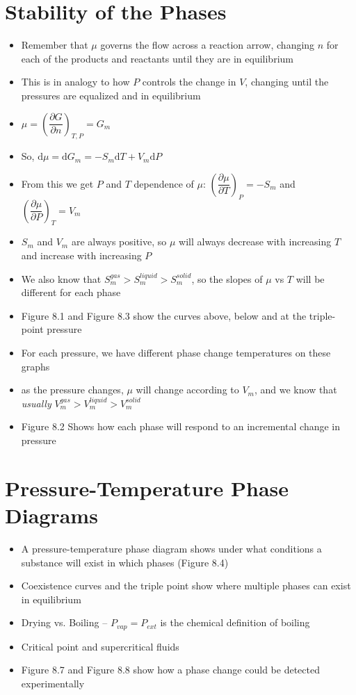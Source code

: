 \documentclass[12pt, openany, letterpaper]{memoir}
\begin{document}
\section*{Stability of the Phases}
\begin{itemize}
	\item Remember that $\mu$ governs the flow across a reaction arrow, changing $n$ for each of the products and reactants until they are in equilibrium
	\item This is in analogy to how $P$ controls the change in $V$, changing until the pressures are equalized and in equilibrium
	\item $\mu = \left(\dfrac{\partial G}{\partial n}\right)_{T,P}=G_m$
	\item So, $\mathrm{d}\mu=\mathrm{d}G_m=-S_m\mathrm{d}T+V_m\mathrm{d}P$
	\item From this we get $P$ and $T$ dependence of $\mu$: $\left(\dfrac{\partial \mu}{\partial T}\right)_P=-S_m$ and $\left(\dfrac{\partial \mu}{\partial P}\right)_T=V_m$
	\item $S_m$ and $V_m$ are always positive, so $\mu$ will always decrease with increasing $T$ and increase with increasing $P$
	\item We also know that $S_m^{gas}>S_m^{liquid}>S_m^{solid}$, so the slopes of $\mu$ vs $T$ will be different for each phase
	\item Figure 8.1 and Figure 8.3 show the curves above, below and at the triple-point pressure
	\item For each pressure, we have different phase change temperatures on these graphs
	\item as the pressure changes, $\mu$ will change according to $V_m$, and we know that \emph{usually} $V_m^{gas}>V_m^{liquid}>V_m^{solid}$
	\item Figure 8.2 Shows how each phase will respond to an incremental change in pressure
\end{itemize}
\section*{Pressure-Temperature Phase Diagrams}
\begin{itemize}
	\item A pressure-temperature phase diagram shows under what conditions a substance will exist in which phases (Figure 8.4)
	\item Coexistence curves and the triple point show where multiple phases can exist in equilibrium
	\item Drying vs. Boiling -- $P_{vap}=P_{ext}$ is the chemical definition of boiling
	\item Critical point and supercritical fluids
	\item Figure 8.7 and Figure 8.8 show how a phase change could be detected experimentally
\end{itemize}
\end{document}
